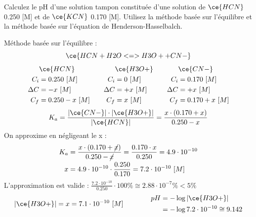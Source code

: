\documentclass[
  11pt,
  a4paper,
  openany]{book}
\begin{document}
\begin{Exercise}
Calculez le pH d'une solution tampon constituée d'une solution de \(\ce{HCN}\) 0.250 {[}M{]} et de \(\ce{KCN}\) 0.170 {[}M{]}. Utilisez la méthode basée sur l'équilibre et la méthode basée sur l'équation de Henderson-Hasselbalch.

\end{Exercise}

\begin{Answer}
Méthode basée sur l'équilibre :
\[
\ce{HCN + H2O <=> H3O+ + CN-}
\]
\[
\begin{split}
&\ce{HCN}\\
C_i &= 0.250\ [M] \\
\Delta C &= - x\ [M] \\
C_f &= 0.250 - x\ [M] \\
\end{split}
\qquad
\begin{split}
&\ce{H3O+}\\
C_i &= 0\ [M] \\
\Delta C &= + x\ [M] \\
C_f &= x\ [M] \\
\end{split}
\qquad
\begin{split}
&\ce{CN-}\\
C_i &= 0.170\ [M] \\
\Delta C &= + x\ [M] \\
C_f &= 0.170 + x\ [M] \\
\end{split}
\]
\[
K_a = \frac{|\ce{CN-}| \cdot |\ce{H3O+}|}{|\ce{HCN}|} = \frac{x \cdot (0.170 + x)}{0.250 - x}
\]
On approxime en négligeant le x :
\[
\begin{split}
K_a &= \frac{x \cdot (0.170 + \cancel{x})}{0.250 - \cancel{x}} = \frac{0.170 \cdot x}{0.250} = 4.9 \cdot 10^{-10} \\
x &= 4.9 \cdot 10^{-10} \cdot \frac{0.250}{0.170} = 7.2 \cdot 10^{-10}\ [M]
\end{split}
\]
L'approximation est valide : \(\frac{7.2 \cdot 10^{-10}}{0.250} \cdot 100\% \cong 2.88 \cdot 10^{-7}\% < 5\%\)
\[
\begin{split}
|\ce{H3O+}| = x = 7.1 \cdot 10^{-10}\ [M]
\end{split}
\qquad\qquad
\begin{split}
pH &= - \log |\ce{H3O+}| \\
 &= - \log 7.2 \cdot 10^{-10} \cong 9.142
\end{split}
\]


\end{Answer}
\end{document}
